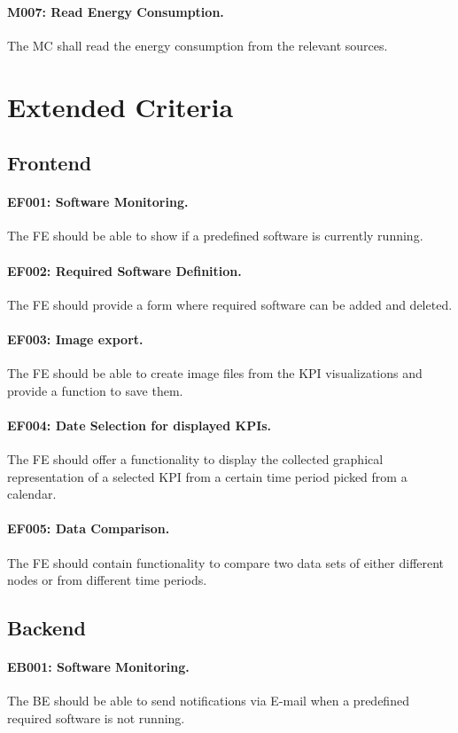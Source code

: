 \documentclass{scrreprt}
\begin{document}
\paragraph{M007: Read Energy Consumption.} The MC shall read the energy consumption from the relevant sources.

\section{Extended Criteria}
\subsection{Frontend}
\paragraph{EF001: Software Monitoring.} The FE should be able to show if a predefined software is currently running.
\paragraph{EF002: Required Software Definition.} The FE should provide a form where required software can be added and deleted.
\paragraph{EF003: Image export.} The FE should be able to create image files from the KPI visualizations and provide a function to save them.
\paragraph{EF004: Date Selection for displayed KPIs.} The FE should offer a functionality to display the collected graphical representation of a selected KPI from a certain time period picked from a calendar.
\paragraph{EF005: Data Comparison.} The FE should contain functionality to compare two data sets of either different nodes or from different time periods.

\subsection{Backend}
\paragraph{EB001: Software Monitoring.} The BE should be able to send notifications via E-mail when a predefined required software is not running.
\end{document}
